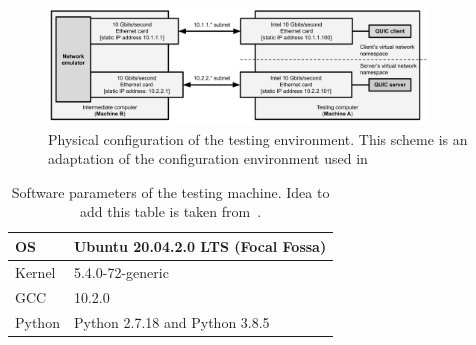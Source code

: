 \documentclass[12pt,a4paper]{report}
\begin{document}
    \begin{figure}[ht]
    \centering
    \includegraphics[width=0.9\textwidth]{figs/Physical_testing_environment.png}
    \caption[Physical configuration of the testing environment]{Physical configuration of the testing environment. This scheme is an adaptation of the configuration environment used in ~\cite{Making_QUIC_Quicker}}
    \label{fig:Physical_testing_environment}
    \end{figure}
    
    \begin{table}[ht]
        \centering
        \begin{tabular}{|l|l|}
        \hline
        OS     & Ubuntu 20.04.2.0 LTS (Focal Fossa) \\ \hline
        Kernel & 5.4.0-72-generic                   \\ \hline
        GCC    & 10.2.0                             \\ \hline
        Python & Python 2.7.18 and Python 3.8.5     \\ \hline
        \end{tabular}
        
        \caption[Software parameters of the testing machine]{Software parameters of the testing machine. Idea to add this table is taken from~\cite{quic_vs_tcp}.}
        \label{software_parameters_of_testing_machine}
    \end{table}
    
\end{document}
